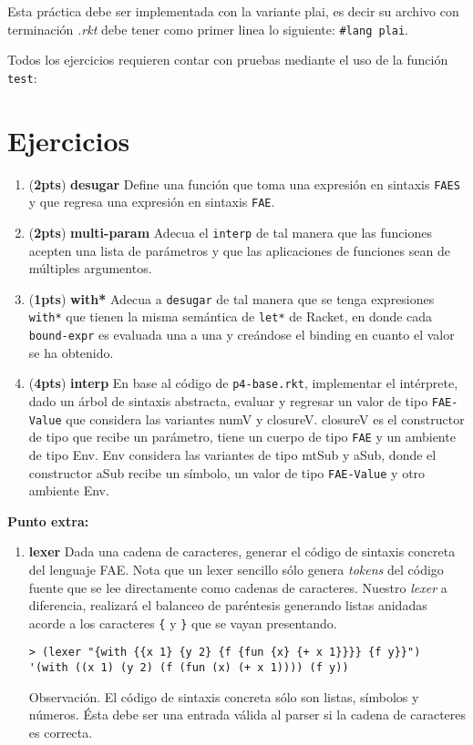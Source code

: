 \documentclass{article}
\newcommand{\grade}[1]{(\textbf{#1pts}) }
\begin{document}
Esta práctica debe ser implementada con la variante plai, es decir
su archivo con terminación \textit{.rkt} debe tener como primer linea lo siguiente:
\texttt{\#lang plai}.

Todos los ejercicios requieren contar con pruebas mediante el uso de
la función \texttt{test}:

\section{Ejercicios}

\begin{enumerate}

\item \grade{2} \textbf{desugar} Define una función que toma una expresión en sintaxis \texttt{FAES} y que regresa una expresión en sintaxis \texttt{FAE}.

\item \grade{2} \textbf{multi-param} Adecua el \texttt{interp} de tal manera que las funciones acepten una lista de parámetros y que las aplicaciones de funciones sean de múltiples argumentos.

\item \grade{1} \textbf{with*} Adecua a \texttt{desugar} de tal manera que se tenga expresiones \texttt{with*} que tienen la misma semántica de \texttt{let*} de Racket, en donde cada \texttt{bound-expr} es evaluada una a una y creándose el binding en cuanto el valor se ha obtenido.

\item \grade{4} \textbf{interp} En base al código de \texttt{p4-base.rkt}, implementar el intérprete, dado un árbol de sintaxis abstracta, evaluar y regresar un valor de tipo \texttt{FAE-Value} que considera las variantes numV y closureV. closureV es el constructor de tipo que recibe un parámetro, tiene un cuerpo de tipo \texttt{FAE} y un ambiente de tipo Env. Env considera las variantes de tipo mtSub y aSub, donde el constructor aSub recibe un símbolo, un valor de tipo \texttt{FAE-Value} y otro ambiente Env.

\end{enumerate}

\textbf{Punto extra:}
\begin{enumerate}
\item \textbf{lexer} Dada una cadena de caracteres, generar el código de sintaxis concreta del lenguaje FAE. Nota que un lexer sencillo sólo genera \emph{tokens} del código fuente que se lee directamente como cadenas de caracteres. Nuestro \emph{lexer} a diferencia, realizará el balanceo de paréntesis generando listas anidadas acorde a los caracteres \texttt{\{} y \texttt{\}} que se vayan presentando.
\begin{verbatim}
> (lexer "{with {{x 1} {y 2} {f {fun {x} {+ x 1}}}} {f y}}")
'(with ((x 1) (y 2) (f (fun (x) (+ x 1)))) (f y))
\end{verbatim}
Observación. El código de sintaxis concreta sólo son listas, símbolos y números. Ésta debe ser una entrada válida al parser si la cadena de caracteres es correcta.
\end{enumerate}
\end{document}
